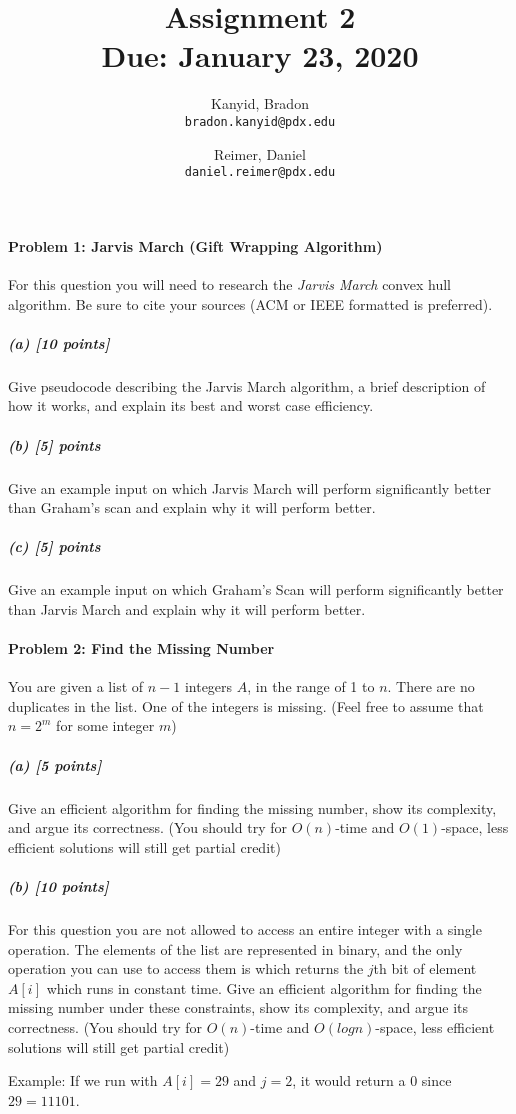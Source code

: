 \documentclass[11pt]{article}
\title{\bf Assignment 2 \\[2ex]
\rm\normalsize Due: January 23, 2020}
\date{}
\author{
  Kanyid, Bradon\\
  \texttt{bradon.kanyid@pdx.edu}
  \and
  Reimer, Daniel\\
  \texttt{daniel.reimer@pdx.edu}
}
\begin{document}
\maketitle

\paragraph{Problem 1: Jarvis March (Gift Wrapping Algorithm)}
For this question you will need to research the {\em Jarvis March} convex hull algorithm. Be sure to cite your sources (ACM or IEEE formatted is preferred).
\subparagraph{(a) [10 points]}
Give pseudocode describing the Jarvis March algorithm, a brief description of how it works, and explain its best and worst case efficiency.

\subparagraph{(b) [5] points}
Give an example input on which Jarvis March will perform significantly better than Graham's scan and explain why it will perform better.

\subparagraph{(c) [5] points}
Give an example input on which Graham's Scan will perform significantly better than Jarvis March and explain why it will perform better.


\paragraph{Problem 2: Find the Missing Number}
You are given a list of $n-1$ integers $A$, in the range of 1 to $n$. There are no duplicates in the list. One of the integers is missing.
(Feel free to assume that $n = 2^m$ for some integer $m$)
\subparagraph{(a) [5 points]}
Give an efficient algorithm for finding the missing number, show its complexity, and argue its correctness.
(You should try for $O(n)$-time and $O(1)$-space, less efficient solutions will still get partial credit)

\subparagraph{(b) [10 points]}
For this question you are not allowed to access an entire integer with a single operation. The elements of the list are represented in binary, and the only operation you can use to access them is  which returns the $j$th bit of element $A[i]$ which runs in constant time. Give an efficient algorithm for finding the missing number under these constraints, show its complexity, and argue its correctness.
(You should try for $O(n)$-time and $O(log n)$-space, less efficient solutions will still get partial credit)

Example: If we run  with $A[i]=29$ and $j=2$, it would return a $0$ since $29=11101$.

\end{document}
